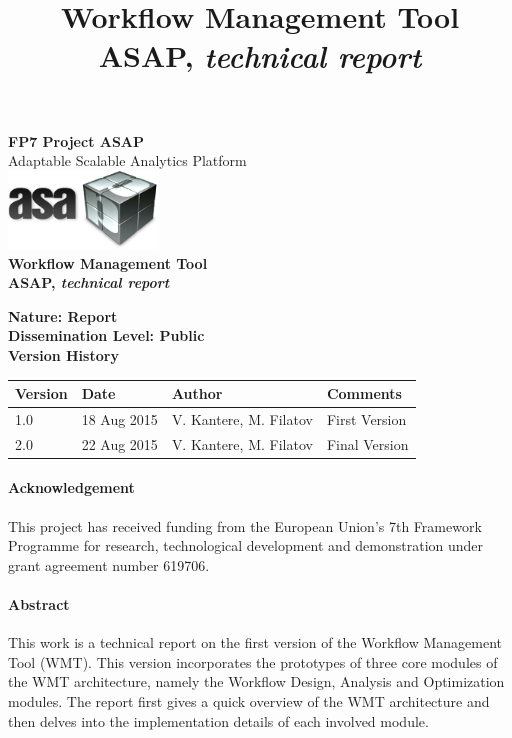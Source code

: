 \documentclass[12pt,openany,onecolumn]{book}
\def\delivtitle{Workflow Management Tool\\ {\small ASAP, {\rm \it technical report}}}
\begin{document}
\title{\delivtitle}
\author{}
\date{}
\newcommand{\eat}[1]{}

\thispagestyle{empty}
\begin{center}
\large
\textbf{FP7 Project ASAP} \\
Adaptable Scalable Analytics Platform\\[2\baselineskip]

\includegraphics[width=4cm]{asap-logo.png}\\[3\baselineskip]

{\Huge\bf \delivtitle}\\[3\baselineskip]
\end{center}

\textbf{Nature: Report}\\[\baselineskip]

\textbf{Dissemination Level: Public}\\[\baselineskip]

\textbf{Version History}
\begin{center}
\begin{tabular}{|l|p{3cm}|p{5cm}|p{3cm}|}
\rowcolor{gray}
\hline
Version & Date        & Author        & Comments \\
\hline
1.0 &  18 Aug 2015 & V. Kantere, M. Filatov & First Version \\
2.0	& 22  Aug 2015 & V. Kantere, M. Filatov & Final Version \\
\hline
\end{tabular}
\end{center}

\paragraph{Acknowledgement}
This project has received funding from the European Union's 7th Framework Programme for research, technological development and demonstration under grant agreement number 619706.

\paragraph{Abstract}
This work is a technical report on the first version of the Workflow Management Tool (WMT). This version incorporates the prototypes of three core modules of the WMT architecture, namely the Workflow Design, Analysis and Optimization modules. The report first gives a quick overview of the WMT architecture and then delves into the implementation details of each involved module.
\end{document}
